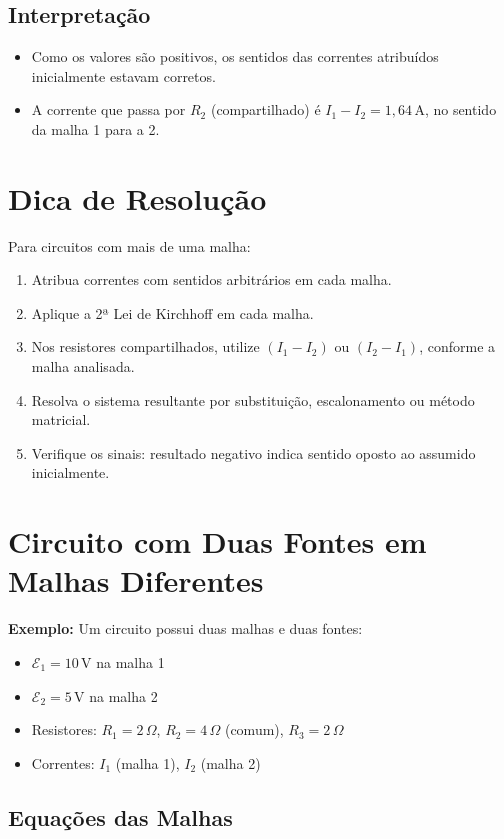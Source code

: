 \subsection{Interpretação}
\begin{itemize}
    \item Como os valores são positivos, os sentidos das correntes atribuídos inicialmente estavam corretos.
    \item A corrente que passa por $R_2$ (compartilhado) é $I_1 - I_2 = 1{,}64\,\text{A}$, no sentido da malha 1 para a 2.
\end{itemize}

\section{Dica de Resolução}
Para circuitos com mais de uma malha:
\begin{enumerate}
    \item Atribua correntes com sentidos arbitrários em cada malha.
    \item Aplique a 2ª Lei de Kirchhoff em cada malha.
    \item Nos resistores compartilhados, utilize $(I_1 - I_2)$ ou $(I_2 - I_1)$, conforme a malha analisada.
    \item Resolva o sistema resultante por substituição, escalonamento ou método matricial.
    \item Verifique os sinais: resultado negativo indica sentido oposto ao assumido inicialmente.
\end{enumerate}

\section{Circuito com Duas Fontes em Malhas Diferentes}

\textbf{Exemplo:} Um circuito possui duas malhas e duas fontes:

\begin{itemize}
    \item $\mathcal{E}_1 = 10\,\text{V}$ na malha 1
    \item $\mathcal{E}_2 = 5\,\text{V}$ na malha 2
    \item Resistores: $R_1 = 2\,\Omega$, $R_2 = 4\,\Omega$ (comum), $R_3 = 2\,\Omega$
    \item Correntes: $I_1$ (malha 1), $I_2$ (malha 2)
\end{itemize}

\subsection{Equações das Malhas}

